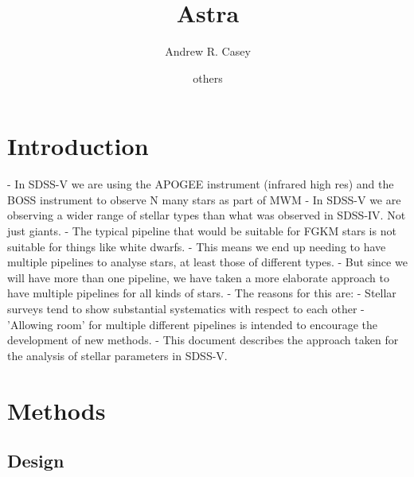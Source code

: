 \documentclass[modern]{aastex631}
\begin{document}
\title{\Huge Astra}

\author[0000-0003-0174-0564]{Andrew R. Casey}

\author{others}

\begin{abstract}

\end{abstract}


\section*{}\clearpage
\section{Introduction}\label{sec:intro}
- In SDSS-V we are using the APOGEE instrument (infrared high res) and the BOSS instrument to observe N many stars as part of MWM
- In SDSS-V we are observing a wider range of stellar types than what was observed in SDSS-IV. Not just giants.
- The typical pipeline that would be suitable for FGKM stars is not suitable for things like white dwarfs.
- This means we end up needing to have multiple pipelines to analyse stars, at least those of different types.
- But since we will have more than one pipeline, we have taken a more elaborate approach to have multiple pipelines for all kinds of stars.
- The reasons for this are:
    - Stellar surveys tend to show substantial systematics with respect to each other
    - 'Allowing room' for multiple different pipelines is intended to encourage the development of new methods.
- This document describes the approach taken for the analysis of stellar parameters in SDSS-V.

\section{Methods}\label{sec:method}


\subsection{Design}
\end{document}
